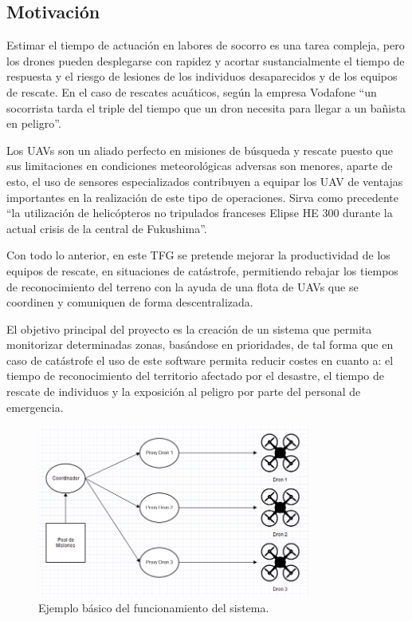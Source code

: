 \documentclass{pre-tfg}
\begin{document}
\subsection{Motivación}

Estimar el tiempo de actuación en labores de socorro es una tarea compleja, pero los drones pueden desplegarse con rapidez y acortar sustancialmente el tiempo de respuesta y el riesgo de lesiones de los individuos desaparecidos y de los equipos de rescate. En el caso de rescates acuáticos, según la empresa Vodafone\cite{tiempomenor} ``un socorrista tarda el triple del tiempo que un dron necesita para llegar a un bañista en peligro''.

Los UAVs son un aliado perfecto en misiones de búsqueda y rescate puesto que sus limitaciones en condiciones meteorológicas adversas son menores, aparte de esto, el uso de sensores especializados contribuyen a equipar los UAV de ventajas importantes en la realización de este tipo de operaciones. Sirva como precedente ``la utilización de helicópteros no tripulados franceses Elipse HE 300 durante la actual crisis de la central de Fukushima''\cite{notripulados}.

Con todo lo anterior, en este TFG se pretende mejorar la productividad de los equipos de rescate, en situaciones de catástrofe, permitiendo rebajar los tiempos de reconocimiento del terreno con la ayuda de una flota de UAVs que se coordinen y comuniquen de forma descentralizada.

El objetivo principal del proyecto es la creación de un sistema que permita monitorizar determinadas zonas, basándose en prioridades, de tal forma que en caso de catástrofe el uso de este software permita reducir costes en cuanto a: el tiempo de reconocimiento del territorio afectado por el desastre, el tiempo de rescate de individuos y la exposición al peligro por parte del personal de emergencia.

\begin{figure}[htb]
\centering
\includegraphics[width=0.8\textwidth]{./figures/dron.png}
\caption{Ejemplo básico del funcionamiento del sistema.}
\end{figure} 
\end{document}
